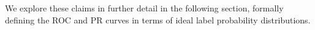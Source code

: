 We explore these claims in further detail in the following section, formally defining the ROC and PR curves in terms of ideal label probability distributions.





% 


